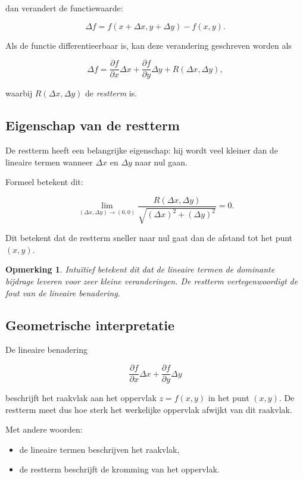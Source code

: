 \documentclass[11pt,a4paper]{article}
\newtheorem{remark}[theorem]{Opmerking}
\begin{document}
    dan verandert de functiewaarde:

    \[
        \Delta f = f(x+\Delta x,y+\Delta y)-f(x,y).
    \]

    Als de functie differentieerbaar is, kan deze verandering geschreven worden als

    \[
        \Delta f
        =
        \frac{\partial f}{\partial x}\Delta x
        +
        \frac{\partial f}{\partial y}\Delta y
        +
        R(\Delta x,\Delta y),
    \]

    waarbij $R(\Delta x,\Delta y)$ de \textit{restterm} is.

    \subsection{Eigenschap van de restterm}

    De restterm heeft een belangrijke eigenschap: hij wordt veel kleiner dan de
    lineaire termen wanneer $\Delta x$ en $\Delta y$ naar nul gaan.

    Formeel betekent dit:

    \[
        \lim_{(\Delta x,\Delta y)\to(0,0)}
        \frac{R(\Delta x,\Delta y)}
        {\sqrt{(\Delta x)^2+(\Delta y)^2}}
        =
        0.
    \]

    Dit betekent dat de restterm sneller naar nul gaat dan de afstand tot het punt
    $(x,y)$.

    \begin{remark}
        Intuïtief betekent dit dat de lineaire termen de dominante bijdrage leveren voor
        zeer kleine veranderingen. De restterm vertegenwoordigt de fout van de lineaire
        benadering.
    \end{remark}

    \subsection{Geometrische interpretatie}

    De lineaire benadering

    \[
        \frac{\partial f}{\partial x}\Delta x
        +
        \frac{\partial f}{\partial y}\Delta y
    \]

    beschrijft het raakvlak aan het oppervlak $z=f(x,y)$ in het punt $(x,y)$.
    De restterm meet dus hoe sterk het werkelijke oppervlak afwijkt van dit raakvlak.

    Met andere woorden:

    \begin{itemize}
        \item de lineaire termen beschrijven het raakvlak,
        \item de restterm beschrijft de kromming van het oppervlak.
    \end{itemize}
\end{document}
